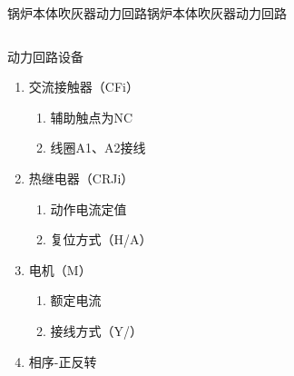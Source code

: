 \documentclass[12pt,hyperref={CJKbookmarks=true}]{beamer} %
\begin{document}
\begin{frame}{锅炉本体吹灰器动力回路}{锅炉本体吹灰器动力回路}
\begin{columns}
\begin{block}{动力回路设备}
				\begin{enumerate}
				\item  交流接触器（CFi）
\begin{enumerate}
				\item  辅助触点为NC
				\item  线圈A1、A2接线
				\end{enumerate}
				\item  热继电器（CRJi）
\begin{enumerate}
				\item  动作电流定值
				\item  复位方式（H/A）
				\end{enumerate}
				\item  电机（M）
\begin{enumerate}
				\item  额定电流
				\item  接线方式（Y/）
				\end{enumerate}
\item  相序-正反转
				\end{enumerate}
\end{block}
		\end{columns}
	\end{frame}
\end{document}

